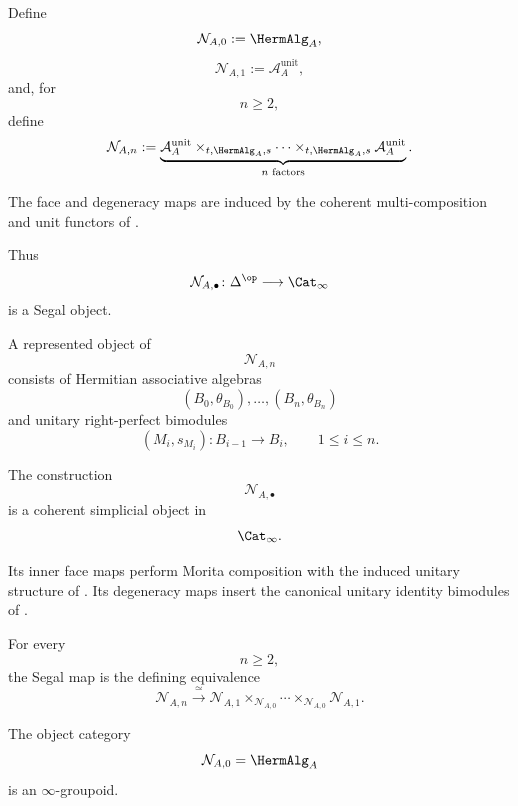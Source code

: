 \begin{construction}
\label{con:unitary-morita-segal-object}
Define
\[
    \mathcal N_{A,0}
    :=
    \HermAlg_A,
\]
\[
    \mathcal N_{A,1}
    :=
    \mathcal A_A^{\mathrm{unit}},
\]
and, for
\[
    n\geq2,
\]
define
\[
    \mathcal N_{A,n}
    :=
    \underbrace{
        \mathcal A_A^{\mathrm{unit}}
        \times_{t,\HermAlg_A,s}
        \cdots
        \times_{t,\HermAlg_A,s}
        \mathcal A_A^{\mathrm{unit}}
    }_{n\text{ factors}}.
\]

The face and degeneracy maps are induced by the coherent
multi-composition and unit functors of
.

Thus
\[
    \mathcal N_{A,\bullet}
    \colon
    \Delta^{\op}
    \longrightarrow
    \Cat_\infty
\]
is a Segal object.

A represented object of
\[
    \mathcal N_{A,n}
\]
consists of Hermitian associative algebras
\[
    (B_0,\theta_{B_0}),
    \ldots,
    (B_n,\theta_{B_n})
\]
and unitary right-perfect bimodules
\[
    (M_i,s_{M_i})
    \colon
    B_{i-1}
    \longrightarrow
    B_i,
    \qquad
    1\leq i\leq n.
\]
\end{construction}

\begin{proposition}
\label{prop:unitary-morita-segal-object}
The construction
\[
    \mathcal N_{A,\bullet}
\]
is a coherent simplicial object in
\[
    \Cat_\infty.
\]

Its inner face maps perform Morita composition with the induced unitary
structure of
.
Its degeneracy maps insert the canonical unitary identity bimodules of
.

For every
\[
    n\geq2,
\]
the Segal map is the defining equivalence
\[
    \mathcal N_{A,n}
    \xrightarrow{\;\simeq\;}
    \mathcal N_{A,1}
    \times_{\mathcal N_{A,0}}
    \cdots
    \times_{\mathcal N_{A,0}}
    \mathcal N_{A,1}.
\]

The object category
\[
    \mathcal N_{A,0}
    =
    \HermAlg_A
\]
is an $\infty$-groupoid.
\end{proposition}

